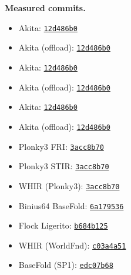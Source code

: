 \medskip
\noindent\textbf{Measured commits.}
\begin{itemize}\setlength{\itemsep}{0pt}
\item Akita: \href{https://github.com/LayerZero-Labs/akita/commit/12d486b0bca2814956d480aa121130e2702f8612}{\texttt{12d486b0}}
\item Akita (offload): \href{https://github.com/LayerZero-Labs/akita/commit/12d486b0bca2814956d480aa121130e2702f8612}{\texttt{12d486b0}}
\item Akita: \href{https://github.com/LayerZero-Labs/akita/commit/12d486b0bca2814956d480aa121130e2702f8612}{\texttt{12d486b0}}
\item Akita (offload): \href{https://github.com/LayerZero-Labs/akita/commit/12d486b0bca2814956d480aa121130e2702f8612}{\texttt{12d486b0}}
\item Akita: \href{https://github.com/LayerZero-Labs/akita/commit/12d486b0bca2814956d480aa121130e2702f8612}{\texttt{12d486b0}}
\item Akita (offload): \href{https://github.com/LayerZero-Labs/akita/commit/12d486b0bca2814956d480aa121130e2702f8612}{\texttt{12d486b0}}
\item Plonky3 FRI: \href{https://github.com/Plonky3/Plonky3/commit/3acc8b70e68d6c2afc03930700c26540bd47458d}{\texttt{3acc8b70}}
\item Plonky3 STIR: \href{https://github.com/Plonky3/Plonky3/commit/3acc8b70e68d6c2afc03930700c26540bd47458d}{\texttt{3acc8b70}}
\item WHIR (Plonky3): \href{https://github.com/Plonky3/Plonky3/commit/3acc8b70e68d6c2afc03930700c26540bd47458d}{\texttt{3acc8b70}}
\item Binius64 BaseFold: \href{https://github.com/binius-zk/binius64/commit/6a179536d90fcc76eeca0cee4e059f5e17efb459}{\texttt{6a179536}}
\item Flock Ligerito: \href{https://github.com/succinctlabs/flock/commit/b684b1258e4b1f202bec24afd660ace851b09e5e}{\texttt{b684b125}}
\item WHIR (WorldFnd): \href{https://github.com/worldfnd/whir/commit/c03a4a512bd904562a22e14bc7b3064392448b99}{\texttt{c03a4a51}}
\item BaseFold (SP1): \href{https://github.com/succinctlabs/sp1/commit/edc07b68c92c17e4fc8658c39a2ef8d9ea5d95dc}{\texttt{edc07b68}}
\end{itemize}


